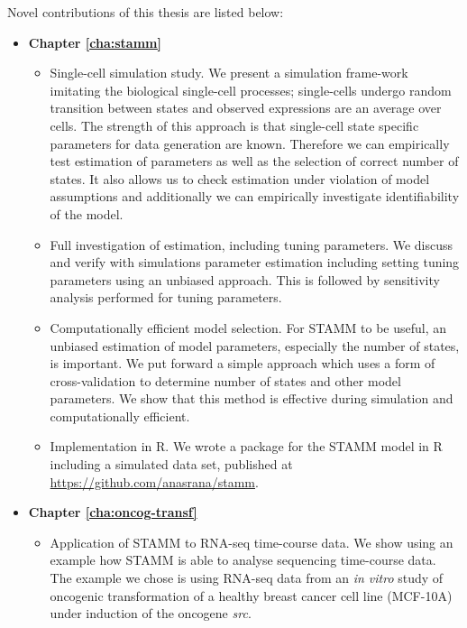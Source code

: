 \newpage
\noindent Novel contributions of this thesis are listed below:
\begin{itemize}
\item {\bf Chapter \ref{cha:stamm}}
\begin{itemize}
\item Single-cell simulation study. We present a simulation frame-work imitating the biological single-cell processes; single-cells undergo random transition between states and observed expressions are an average over cells. The strength of this approach is that single-cell state specific parameters for data generation are known. Therefore we can empirically test estimation of parameters as well as the selection of correct number of states. It also allows us to check estimation under violation of model assumptions and additionally we can empirically investigate identifiability of the model.

\item Full investigation of estimation, including tuning parameters. We discuss and verify with simulations parameter estimation including setting tuning parameters using an unbiased approach. This is followed by sensitivity analysis performed for tuning parameters.

\item Computationally efficient model selection. For STAMM to be useful, an unbiased estimation of model parameters, especially the number of states, is important. We put forward a simple approach which uses a form of cross-validation to determine number of states and other model parameters. We show that this method is effective during simulation and computationally efficient.

\item Implementation in R. We wrote a package for the STAMM model in R including a simulated data set, published at \url{https://github.com/anasrana/stamm}.

\end{itemize}

\item {\bf Chapter \ref{cha:oncog-transf}}

\begin{itemize}
\item Application of STAMM to RNA-seq time-course data.
We show using an example how STAMM is able to analyse sequencing time-course data. The example we chose is using RNA-seq data from an {\it in vitro} study of oncogenic transformation of a healthy breast cancer cell line (MCF-10A) under induction of the oncogene {\it src}.


\end{itemize}
\end{itemize}
